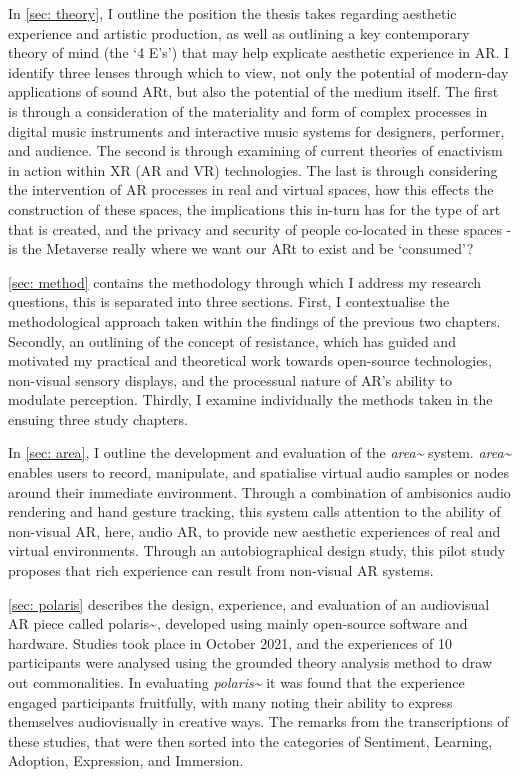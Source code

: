 In \autoref{sec: theory}, I outline the position the thesis takes regarding aesthetic experience and artistic production, as well as outlining a key contemporary theory of mind (the `4 E's') that may help explicate aesthetic experience in AR. I identify three lenses through which to view, not only the potential of modern-day applications of sound ARt, but also the potential of the medium itself. The first is through a consideration of the materiality and form of complex processes in digital music instruments and interactive music systems for designers, performer, and audience. The second is through examining of current theories of enactivism in action within XR (AR and VR) technologies. The last is through considering the intervention of AR processes in real and virtual spaces, how this effects the construction of these spaces, the implications this in-turn has for the type of art that is created, and the privacy and security of people co-located in these spaces - is the Metaverse really where we want our ARt to exist and be `consumed'? 

\autoref{sec: method} contains the methodology through which I address my research questions, this is separated into three sections. First, I contextualise the methodological approach taken within the findings of the previous two chapters. Secondly, an outlining of the concept of resistance, which has guided and motivated my practical and theoretical work towards open-source technologies, non-visual sensory displays, and the processual nature of AR's ability to modulate perception. Thirdly, I examine individually the methods taken in the ensuing three study chapters.
 
In \autoref{sec: area}, I outline the development and evaluation of the \textit{area\textasciitilde{}} system. \textit{area\textasciitilde{}} enables users to record, manipulate, and spatialise virtual audio samples or nodes around their immediate environment. Through a combination of ambisonics audio rendering and hand gesture tracking, this system calls attention to the ability of non-visual AR, here, audio AR, to provide new aesthetic experiences of real and virtual environments. Through an autobiographical design study, this pilot study proposes that rich experience can result from non-visual AR systems. 

\autoref{sec: polaris} describes the design, experience, and evaluation of an audiovisual AR piece called {polaris\textasciitilde{}}, developed using mainly open-source software and hardware. Studies took place in October 2021, and the experiences of 10 participants were analysed using the grounded theory analysis method to draw out commonalities. In evaluating \textit{polaris\textasciitilde{}} it was found that the experience engaged participants fruitfully, with many noting their ability to express themselves audiovisually in creative ways. The remarks from the transcriptions of these studies, that were then sorted into the categories of Sentiment, Learning, Adoption, Expression, and Immersion. 

